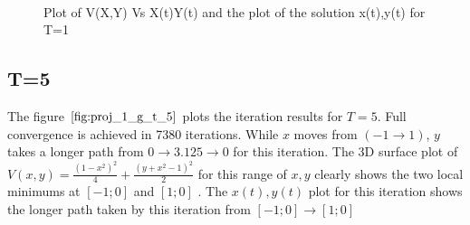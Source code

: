 \documentclass[twoside,12pt]{article}
\begin{document}
{\begin{figure}[htbp!]
\begin{center}
{                    }\\ %
    \end{center}
    \caption{%
     Plot of V(X,Y) Vs X(t)Y(t) and the plot of the solution x(t),y(t) for T=1
     }%
   \label{fig:proj_1_g_t_1}
\end{figure}
}

\FloatBarrier
\subsection{T=5}
{
The figure $\eqref{fig:proj_1_g_t_5}$ plots the iteration results for $T=5$. Full convergence is achieved in 7380 iterations. While $x$ moves from $(-1 \to 1)$, $y$ takes a longer path from $0 \to 3.125 \to 0$ for this iteration. The 3D surface plot of $V(x,y) =  \frac{(1-x^2)^2}{4} + \frac{(y+x^2-1)^2}{2}$ for this range of $x,y$ clearly shows the two local minimums at $[-1;0]$ and $[1;0]$ . The $x(t),y(t)$ plot for this iteration shows the longer path taken by this iteration from $[-1;0] \to [1;0]$
\begin{figure}[htbp!]
     \begin{center}
            \hspace*{-1.4in}           
                    \\%
                    \subfigure[]{%
                    \hspace*{-1.6in}   
}
\end{center}
\end{figure}}
\end{document}
